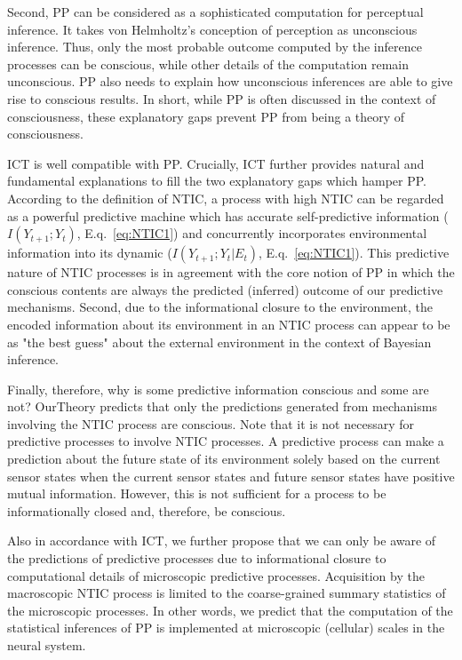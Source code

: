 \documentclass[utf8]{article}
\begin{document}
    		Second, PP can be considered as a sophisticated computation for perceptual inference. It takes von Helmholtz's conception of perception as unconscious inference. Thus, only the most probable outcome computed by the inference processes can be conscious, while other details of the computation remain unconscious. PP also needs to explain how unconscious inferences are able to give rise to conscious results. In short, while PP is often discussed in the context of consciousness, these explanatory gaps prevent PP from being a theory of consciousness. 
    		
    		ICT is well compatible with PP. Crucially, ICT further provides natural and fundamental explanations to fill the two explanatory gaps which hamper PP. According to the definition of NTIC, a process with high NTIC can be regarded as a powerful predictive machine which has accurate self-predictive information ($I(Y_{t+1};Y_{t})$, E.q.~\ref{eq:NTIC1}) and concurrently incorporates environmental information into its dynamic ($I(Y_{t+1};Y_{t}|E_{t})$, E.q.~\ref{eq:NTIC1}). This predictive nature of NTIC processes is in agreement with the core notion of PP in which the conscious contents are always the predicted (inferred) outcome of our predictive mechanisms. Second, due to the informational closure to the environment, the encoded information about its environment in an NTIC process can appear to be as "the best guess" about the external environment in the context of Bayesian inference. 
    		
    		Finally, therefore, why is some predictive information conscious and some are not? \ac{OurTheory} predicts that only the predictions generated from mechanisms involving the NTIC process are conscious. Note that it is not necessary for predictive processes to involve NTIC processes. A predictive process can make a prediction about the future state of its environment solely based on the current sensor states when the current sensor states and future sensor states have positive mutual information. However, this is not sufficient for a process to be informationally closed and, therefore, be conscious.
    		
            Also in accordance with ICT, we further propose that we can only be aware of the predictions of predictive processes due to informational closure to computational details of microscopic predictive processes. Acquisition by the macroscopic NTIC process is limited to the coarse-grained summary statistics of the microscopic processes. In other words, we predict that the computation of the statistical inferences of PP is implemented at microscopic (cellular) scales in the neural system. 
        
\end{document}
